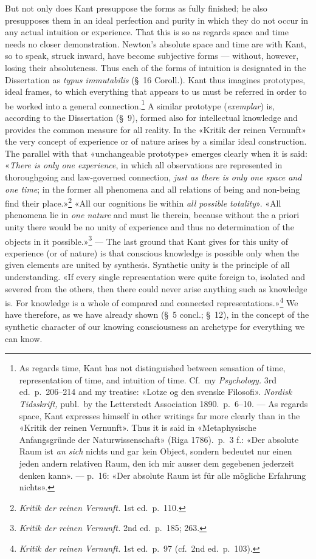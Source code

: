 \documentclass[12pt,a4paper]{article}
\newcommand{\opage}[1]{\marginnote{\footnotesize\textit{[#1]}}}
\begin{document}
\opage{31}But not only does Kant presuppose the forms as fully finished; he also
presupposes them in an ideal perfection and purity in which they do not
occur in any actual intuition or experience. That this is so as regards
space and time needs no closer demonstration. Newton's absolute space and
time are with Kant, so to speak, struck inward, have become subjective
forms --- without, however, losing their absoluteness. Thus each of the
forms of intuition is designated in the Dissertation as \emph{typus
immutabilis} (§\ 16 Coroll.). Kant thus imagines prototypes, ideal frames,
to which everything that appears to us must be referred in order to be
worked into a general connection.\footnote{As regards time, Kant has not
distinguished between sensation of time, representation of time, and
intuition of time. Cf.\ my \textit{Psychology.} 3rd ed.\ p.\ 206--214 and
my treatise: «Lotze og den svenske Filosofi». \textit{Nordisk Tidsskrift,}
publ.\ by the Letterstedt Association 1890.\ p.\ 6--10. --- As regards
space, Kant expresses himself in other writings far more clearly than in
the «Kritik der reinen Vernunft». Thus it is said in «Metaphysische
Anfangsgründe der Naturwissenschaft» (Riga 1786).\ p.\ 3 f.: «Der absolute
Raum ist \emph{an sich} nichts und gar kein Object, sondern bedeutet nur einen
jeden andern relativen Raum, den ich mir ausser dem gegebenen jederzeit
denken kann». --- p.\ 16: «Der absolute Raum ist für alle mögliche
Erfahrung nichts».} A similar prototype (\textit{exemplar}) is, according
to the Dissertation (§\ 9), formed also for intellectual knowledge and
provides the common measure for all reality. In the «Kritik der reinen
Vernunft» the very concept of experience or of nature arises by a similar
ideal construction. The parallel with that «unchangeable prototype» emerges
clearly when it is said: «\emph{There is only one experience}, in which all
observations are represented in thoroughgoing and law-governed connection,
\emph{just as there is only one space and one time}; in the former all phenomena
and all relations of being and non-being find their
place.»\footnote{\textit{Kritik der reinen Vernunft.} 1st ed.\ p.\ 110.}
«All our cognitions lie within \emph{all possible totality}». «All phenomena lie
in \emph{one nature} and must lie therein, because without the a priori unity
there would be no unity of experience and thus no determination of the
objects in it possible.»\footnote{\textit{Kritik der reinen Vernunft.} 2nd
ed.\ p.\ 185; 263.} --- The last ground that Kant gives for this unity of
experience (or of nature) is that conscious knowledge is possible only when
the given elements are united by synthesis. Synthetic unity is the
principle of all understanding. «If every single representation were quite
foreign to, isolated and severed from the others, then there could never
arise anything such as knowledge is. For knowledge is a whole of compared
and connected representations.»\footnote{\textit{Kritik der reinen
Vernunft.} 1st ed.\ p.\ 97 (cf.\ 2nd ed.\ p.\ 103).} We have therefore, \opage{32}as
we have already shown (§\ 5 concl.; §\ 12), in the concept of the synthetic
character of our knowing consciousness an archetype for everything we can
know.
\end{document}
